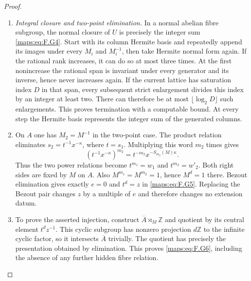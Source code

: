 \begin{proof}
\begin{enumerate}[label={$\langle1\rangle$\arabic*.}]
\item \emph{Integral closure and two-point elimination.}
In a normal abelian fibre subgroup, the normal closure of $U$
is precisely the integer sum \eqref{maps:eq:F.G4}.  Start with its column
Hermite basis and repeatedly append its images under every
$M_i$ and $M_i^{-1}$, then take Hermite normal form again.
If the rational rank increases, it can do so at most three
times.  At the first nonincrease the rational span is invariant
under every generator and its inverse, hence never increases
again.  If the current lattice has saturation index $D$ in
that span, every subsequent strict enlargement divides this
index by an integer at least two.  There can therefore be at
most $\lfloor\log_2D\rfloor$ such enlargements.  This proves
termination with a computable bound. At every step the Hermite
basis represents the integer sum of the generated columns.

\item On $A$ one has $M_2=M^{-1}$ in the two-point case.  The product
relation eliminates $s_2=t^{-1}x^{-\kappa}$, where $t=s_1$.
Multiplying this word $m_2$ times gives
\[
        (t^{-1}x^{-\kappa})^{m_2}
            =t^{-m_2}x^{-S_{m_2}(M)\kappa}.
\]
Thus the two power relations become $t^{m_1}=w_1$ and
$t^{m_2}=w'_2$.  Both right sides are fixed by $M$ on $A$.
Also $M^{m_1}=M^{m_2}=1$, hence $M^d=1$ there.
Bezout elimination gives exactly $e=0$ and $t^d=z$ in
\eqref{maps:eq:F.G5}.  Replacing the Bezout pair changes $z$ by a multiple
of $e$ and therefore changes no extension datum.

\item To prove the asserted injection, construct
$\overline A\rtimes_M\mathbb Z$ and quotient by its central
element $t^dz^{-1}$.  This cyclic subgroup has nonzero
projection $d\mathbb Z$ to the infinite cyclic factor, so it
intersects $\overline A$ trivially.  The quotient has precisely
the presentation obtained by elimination.  This proves \eqref{maps:eq:F.G6},
including the absence of any further hidden fibre relation.


\end{enumerate}
\end{proof}
